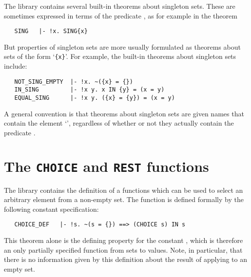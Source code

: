 \noindent The library contains several built-in theorems about singleton sets.
These are sometimes expressed in terms of the predicate , as for
example in the theorem

\begin{hol}
\begin{verbatim}
   SING   |- !x. SING{x}
\end{verbatim}\end{hol}

\noindent But properties of singleton sets are more usually formulated as
theorems about sets of the form `{\small\verb"{x}"}'. For example, the built-in
theorems about singleton sets include:

\begin{hol}
\begin{verbatim}
   NOT_SING_EMPTY  |- !x. ~({x} = {})
   IN_SING         |- !x y. x IN {y} = (x = y)
   EQUAL_SING      |- !x y. ({x} = {y}) = (x = y)
\end{verbatim}\end{hol}

\noindent A general
convention is that theorems about singleton sets are given names that contain
the element `', regardless of whether or not they actually contain the
predicate .

\section{The {\tt CHOICE} and {\tt REST} functions}

The  library contains the definition of a functions 
which can be used to select an arbitrary element from a non-empty set. The
function  is defined formally by the following constant
specification:

\begin{hol}
\begin{verbatim}
   CHOICE_DEF   |- !s. ~(s = {}) ==> (CHOICE s) IN s
\end{verbatim}\end{hol}

\noindent This theorem alone is the defining property for the constant
, which is therefore an only partially specified function from sets
to values.  Note, in particular, that there is no information given by this
definition about the result of applying  to an empty set.

